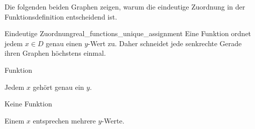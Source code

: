\par\medskip\noindent\begin{minipage}{\linewidth}
Die folgenden beiden Graphen zeigen, warum die eindeutige Zuordnung in der
Funktionsdefinition entscheidend ist.
\par\smallskip
\begin{KeyPointBox}{Eindeutige Zuordnung}{real_functions_unique_assignment}
  Eine Funktion ordnet jedem $x\in D$ genau einen $y$-Wert zu. Daher
  schneidet jede senkrechte Gerade ihren Graphen höchstens einmal.
  \par\smallskip
  \begin{minipage}[t]{0.48\linewidth}
    \centering
    \par\smallskip
    \enspace \textcolor{THMBlue}{Funktion}
    \par
    Jedem $x$ gehört genau ein $y$.
  \end{minipage}\hfill
  \begin{minipage}[t]{0.48\linewidth}
    \centering
    \par\smallskip
    \enspace \textcolor{red!75!black}{Keine Funktion}
    \par
    Einem $x$ entsprechen mehrere $y$-Werte.
  \end{minipage}
\end{KeyPointBox}
\end{minipage}

